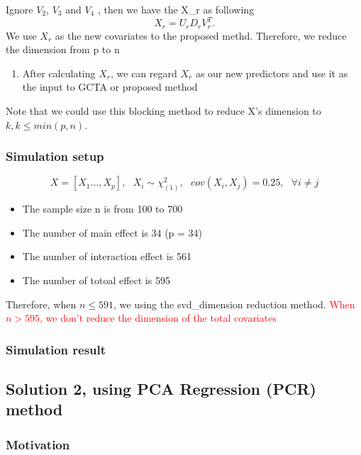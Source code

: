 \documentclass[]{article}
\providecommand{\tightlist}{%
  \setlength{\itemsep}{0pt}\setlength{\parskip}{0pt}}
\begin{document}
Ignore \(V_2\), \(V_3\) and \(V_4\) , then we have the X\_r as following
\[
  X_r = U_rD_rV_r^T.
\] We use \(X_r\) as the new covariates to the proposed methd.
Therefore, we reduce the dimension from p to n

\begin{enumerate}
\def\labelenumi{\arabic{enumi}.}
\tightlist
\item
  After calculating \(X_r\), we can regard \(X_r\) as our new predictors
  and use it as the input to GCTA or proposed method
\end{enumerate}

Note that we could use this blocking method to reduce X's dimension to
\(k, k \leq min(p,n)\).

\subsubsection{Simulation setup}\label{simulation-setup}

\[
  X = [X_1 \dots, X_p] ,~~~ X_i \sim \chi_{(1)}^2, ~~~ cov(X_i, X_j) = 0.25,~~~ \forall  i \ne j 
\]

\begin{itemize}
\tightlist
\item
  The sample size n is from 100 to 700
\item
  The number of main effect is 34 (p = 34)
\item
  The number of interaction effect is 561
\item
  The number of totoal effect is 595
\end{itemize}

Therefore, when \(n\leq591\), we using the svd\_dimension reduction
method.
\textcolor{red}{When $n > 595$, we don't reduce the dimension of the total covariates}

\subsubsection{Simulation result}\label{simulation-result}

\subsection{Solution 2, using PCA Regression (PCR)
method}\label{solution-2-using-pca-regression-pcr-method}

\subsubsection{Motivation}\label{motivation-2}
\end{document}
